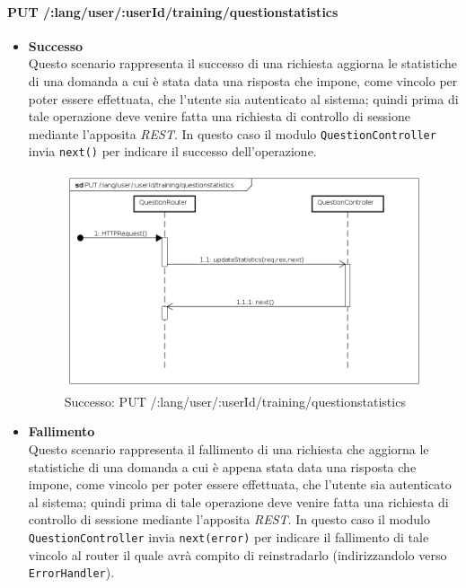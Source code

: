 \paragraph{PUT /:lang/user/:userId/training/questionstatistics} %
\begin{itemize}
\item \textbf{Successo}\\
Questo scenario rappresenta il successo di una richiesta aggiorna le statistiche di una domanda a cui è stata data una risposta che impone, come vincolo per poter essere effettuata, che l'utente sia autenticato al sistema; quindi prima di tale operazione deve venire fatta una richiesta di controllo di sessione mediante l'apposita \textit{REST}. In questo caso il modulo \texttt{QuestionController} invia \texttt{next()} per indicare il successo dell'operazione.

\begin{figure}[ht]
	\centering
	\includegraphics[scale=0.45]{UML/DiagrammiDiSequenza/Back-end/PUT__lang_user__userId_training_questionstatistics_success.png}
	\caption{Successo: PUT /:lang/user/:userId/training/questionstatistics}
\end{figure}
\FloatBarrier

\item \textbf{Fallimento}\\
Questo scenario rappresenta il fallimento di una richiesta che aggiorna le statistiche di una domanda a cui è appena stata data una risposta che impone, come vincolo per poter essere effettuata, che l'utente sia autenticato al sistema; quindi prima di tale operazione deve venire fatta una richiesta di controllo di sessione mediante l'apposita \textit{REST}. In questo caso il modulo \texttt{QuestionController} invia \texttt{next(error)} per indicare il fallimento di tale vincolo al router il quale avrà compito di reinstradarlo (indirizzandolo verso \texttt{ErrorHandler}).


\end{itemize}
